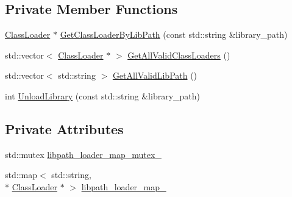 \subsection*{Private Member Functions}
\begin{DoxyCompactItemize}
\item 
\hyperlink{classapollo_1_1cyber_1_1class__loader_1_1ClassLoader}{Class\-Loader} $\ast$ \hyperlink{classapollo_1_1cyber_1_1class__loader_1_1ClassLoaderManager_a3d06e6d3f449f7430061b22f61a01f9a}{Get\-Class\-Loader\-By\-Lib\-Path} (const std\-::string \&library\-\_\-path)
\item 
std\-::vector$<$ \hyperlink{classapollo_1_1cyber_1_1class__loader_1_1ClassLoader}{Class\-Loader} $\ast$ $>$ \hyperlink{classapollo_1_1cyber_1_1class__loader_1_1ClassLoaderManager_a5bed06b0e19310694bd5016868c72fe3}{Get\-All\-Valid\-Class\-Loaders} ()
\item 
std\-::vector$<$ std\-::string $>$ \hyperlink{classapollo_1_1cyber_1_1class__loader_1_1ClassLoaderManager_a82d6543d465a5fd2e19d46a1b9842a59}{Get\-All\-Valid\-Lib\-Path} ()
\item 
int \hyperlink{classapollo_1_1cyber_1_1class__loader_1_1ClassLoaderManager_a6cd6ba7d38e395d61353058d7eebc26d}{Unload\-Library} (const std\-::string \&library\-\_\-path)
\end{DoxyCompactItemize}
\subsection*{Private Attributes}
\begin{DoxyCompactItemize}
\item 
std\-::mutex \hyperlink{classapollo_1_1cyber_1_1class__loader_1_1ClassLoaderManager_a994b015a75ed982747df24c95fbae762}{libpath\-\_\-loader\-\_\-map\-\_\-mutex\-\_\-}
\item 
std\-::map$<$ std\-::string, \\*
\hyperlink{classapollo_1_1cyber_1_1class__loader_1_1ClassLoader}{Class\-Loader} $\ast$ $>$ \hyperlink{classapollo_1_1cyber_1_1class__loader_1_1ClassLoaderManager_a22bbb1ede2aa1ebe5e80650df9bdba7f}{libpath\-\_\-loader\-\_\-map\-\_\-}
\end{DoxyCompactItemize}


